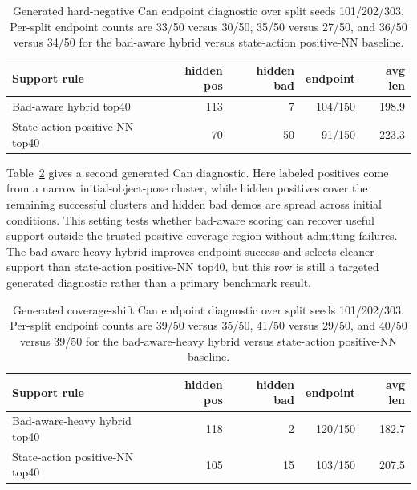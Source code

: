 \documentclass[11pt]{article}
\begin{document}
\begin{table}[t]
  \centering
  \scriptsize
  \setlength{\tabcolsep}{4pt}
  \begin{tabular}{@{}lrrrr@{}}
    \toprule
    Support rule & hidden pos & hidden bad & endpoint & avg len \\
    \midrule
    Bad-aware hybrid top40 & 113 & 7 & 104/150 & 198.9 \\
    State-action positive-NN top40 & 70 & 50 & 91/150 & 223.3 \\
    \bottomrule
  \end{tabular}
  \caption{Generated hard-negative Can endpoint diagnostic over split seeds 101/202/303. Per-split endpoint counts are 33/50 versus 30/50, 35/50 versus 27/50, and 36/50 versus 34/50 for the bad-aware hybrid versus state-action positive-NN baseline.}
  \label{tab:hard-negative-can}
\end{table}

Table~\ref{tab:coverage-shift-can} gives a second generated Can diagnostic. Here labeled positives come from a narrow initial-object-pose cluster, while hidden positives cover the remaining successful clusters and hidden bad demos are spread across initial conditions. This setting tests whether bad-aware scoring can recover useful support outside the trusted-positive coverage region without admitting failures. The bad-aware-heavy hybrid improves endpoint success and selects cleaner support than state-action positive-NN top40, but this row is still a targeted generated diagnostic rather than a primary benchmark result.

\begin{table}[t]
  \centering
  \scriptsize
  \setlength{\tabcolsep}{4pt}
  \begin{tabular}{@{}lrrrr@{}}
    \toprule
    Support rule & hidden pos & hidden bad & endpoint & avg len \\
    \midrule
    Bad-aware-heavy hybrid top40 & 118 & 2 & 120/150 & 182.7 \\
    State-action positive-NN top40 & 105 & 15 & 103/150 & 207.5 \\
    \bottomrule
  \end{tabular}
  \caption{Generated coverage-shift Can endpoint diagnostic over split seeds 101/202/303. Per-split endpoint counts are 39/50 versus 35/50, 41/50 versus 29/50, and 40/50 versus 39/50 for the bad-aware-heavy hybrid versus state-action positive-NN baseline.}
  \label{tab:coverage-shift-can}
\end{table}
\end{document}
